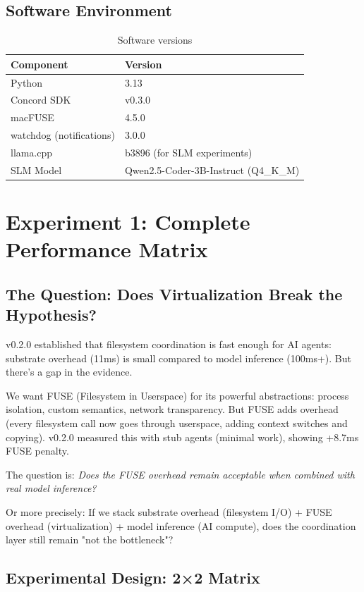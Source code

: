\documentclass[11pt]{article}
\begin{document}
\subsection{Software Environment}

\begin{table}[h]
\centering
\begin{tabular}{ll}
\toprule
\textbf{Component} & \textbf{Version} \\
\midrule
Python & 3.13 \\
Concord SDK & v0.3.0 \\
macFUSE & 4.5.0 \\
watchdog (notifications) & 3.0.0 \\
llama.cpp & b3896 (for SLM experiments) \\
SLM Model & Qwen2.5-Coder-3B-Instruct (Q4\_K\_M) \\
\bottomrule
\end{tabular}
\caption{Software versions}
\end{table}

\section{Experiment 1: Complete Performance Matrix}

\subsection{The Question: Does Virtualization Break the Hypothesis?}

v0.2.0 established that filesystem coordination is fast enough for AI agents: substrate overhead (11ms) is small compared to model inference (100ms+). But there's a gap in the evidence.

We want FUSE (Filesystem in Userspace) for its powerful abstractions: process isolation, custom semantics, network transparency. But FUSE adds overhead (every filesystem call now goes through userspace, adding context switches and copying). v0.2.0 measured this with stub agents (minimal work), showing +8.7ms FUSE penalty.

The question is: \textit{Does the FUSE overhead remain acceptable when combined with real model inference?}

Or more precisely: If we stack substrate overhead (filesystem I/O) + FUSE overhead (virtualization) + model inference (AI compute), does the coordination layer still remain "not the bottleneck"?

\subsection{Experimental Design: 2×2 Matrix}
\end{document}
